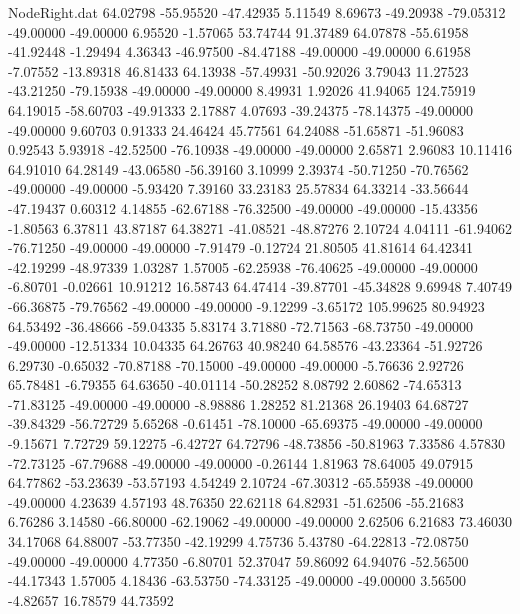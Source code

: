 \begin{filecontents}{NodeRight.dat}
  64.02798  -55.95520  -47.42935     5.11549    8.69673  -49.20938  -79.05312  -49.00000  -49.00000    6.95520   -1.57065   53.74744   91.37489
  64.07878  -55.61958  -41.92448    -1.29494    4.36343  -46.97500  -84.47188  -49.00000  -49.00000    6.61958   -7.07552  -13.89318   46.81433
  64.13938  -57.49931  -50.92026     3.79043   11.27523  -43.21250  -79.15938  -49.00000  -49.00000    8.49931    1.92026   41.94065  124.75919
  64.19015  -58.60703  -49.91333     2.17887    4.07693  -39.24375  -78.14375  -49.00000  -49.00000    9.60703    0.91333   24.46424   45.77561
  64.24088  -51.65871  -51.96083     0.92543    5.93918  -42.52500  -76.10938  -49.00000  -49.00000    2.65871    2.96083   10.11416   64.91010
  64.28149  -43.06580  -56.39160     3.10999    2.39374  -50.71250  -70.76562  -49.00000  -49.00000   -5.93420    7.39160   33.23183   25.57834
  64.33214  -33.56644  -47.19437     0.60312    4.14855  -62.67188  -76.32500  -49.00000  -49.00000  -15.43356   -1.80563    6.37811   43.87187
  64.38271  -41.08521  -48.87276     2.10724    4.04111  -61.94062  -76.71250  -49.00000  -49.00000   -7.91479   -0.12724   21.80505   41.81614
  64.42341  -42.19299  -48.97339     1.03287    1.57005  -62.25938  -76.40625  -49.00000  -49.00000   -6.80701   -0.02661   10.91212   16.58743
  64.47414  -39.87701  -45.34828     9.69948    7.40749  -66.36875  -79.76562  -49.00000  -49.00000   -9.12299   -3.65172  105.99625   80.94923
  64.53492  -36.48666  -59.04335     5.83174    3.71880  -72.71563  -68.73750  -49.00000  -49.00000  -12.51334   10.04335   64.26763   40.98240
  64.58576  -43.23364  -51.92726     6.29730   -0.65032  -70.87188  -70.15000  -49.00000  -49.00000   -5.76636    2.92726   65.78481   -6.79355
  64.63650  -40.01114  -50.28252     8.08792    2.60862  -74.65313  -71.83125  -49.00000  -49.00000   -8.98886    1.28252   81.21368   26.19403
  64.68727  -39.84329  -56.72729     5.65268   -0.61451  -78.10000  -65.69375  -49.00000  -49.00000   -9.15671    7.72729   59.12275   -6.42727
  64.72796  -48.73856  -50.81963     7.33586    4.57830  -72.73125  -67.79688  -49.00000  -49.00000   -0.26144    1.81963   78.64005   49.07915
  64.77862  -53.23639  -53.57193     4.54249    2.10724  -67.30312  -65.55938  -49.00000  -49.00000    4.23639    4.57193   48.76350   22.62118
  64.82931  -51.62506  -55.21683     6.76286    3.14580  -66.80000  -62.19062  -49.00000  -49.00000    2.62506    6.21683   73.46030   34.17068
  64.88007  -53.77350  -42.19299     4.75736    5.43780  -64.22813  -72.08750  -49.00000  -49.00000    4.77350   -6.80701   52.37047   59.86092
  64.94076  -52.56500  -44.17343     1.57005    4.18436  -63.53750  -74.33125  -49.00000  -49.00000    3.56500   -4.82657   16.78579   44.73592

\end{filecontents}
